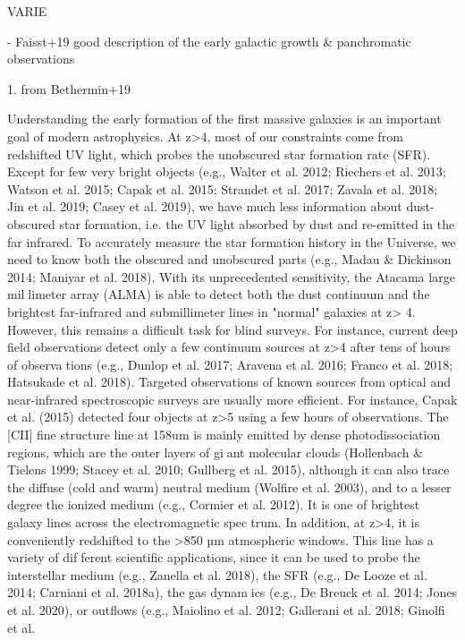


VARIE

 - Faisst+19 good description of the early galactic growth & panchromatic observations

1. from Bethermin+19

Understanding the early formation of the first massive galaxies
is an important goal of modern astrophysics. At z>4, most of
our constraints come from redshifted UV light, which probes the
unobscured star formation rate (SFR). Except for few very bright
objects (e.g., Walter et al. 2012; Riechers et al. 2013; Watson
et al. 2015; Capak et al. 2015; Strandet et al. 2017; Zavala et al.
2018; Jin et al. 2019; Casey et al. 2019), we have much less
information about dust-obscured star formation, i.e. the UV light
absorbed by dust and re-emitted in the far infrared. To accurately
measure the star formation history in the Universe, we need to
know both the obscured and unobscured parts (e.g., Madau &
Dickinson 2014; Maniyar et al. 2018).
With its unprecedented sensitivity, the Atacama large millimeter array (ALMA) is able to detect both the dust continuum
and the brightest far-infrared and submillimeter lines in "normal"
galaxies at z> 4. However, this remains a difficult task for blind
surveys. For instance, current deep field observations detect only
a few continuum sources at z>4 after tens of hours of observations (e.g., Dunlop et al. 2017; Aravena et al. 2016; Franco et al.
2018; Hatsukade et al. 2018). Targeted observations of known
sources from optical and near-infrared spectroscopic surveys are
usually more efficient. For instance, Capak et al. (2015) detected
four objects at z>5 using a few hours of observations.
The [CII] fine structure line at 158um is mainly emitted by
dense photodissociation regions, which are the outer layers of giant molecular clouds (Hollenbach & Tielens 1999; Stacey et al.
2010; Gullberg et al. 2015), although it can also trace the diffuse
(cold and warm) neutral medium (Wolfire et al. 2003), and to a
lesser degree the ionized medium (e.g., Cormier et al. 2012). It
is one of brightest galaxy lines across the electromagnetic spectrum. In addition, at z>4, it is conveniently redshifted to the
>850 µm atmospheric windows. This line has a variety of different scientific applications, since it can be used to probe the
interstellar medium (e.g., Zanella et al. 2018), the SFR (e.g.,
De Looze et al. 2014; Carniani et al. 2018a), the gas dynamics (e.g., De Breuck et al. 2014; Jones et al. 2020), or outflows
(e.g., Maiolino et al. 2012; Gallerani et al. 2018; Ginolfi et al.

